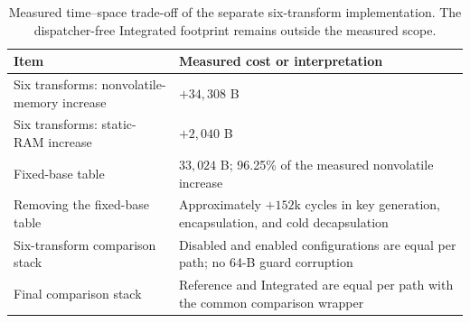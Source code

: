 \begin{table}[t]
\centering
\caption{Measured time--space trade-off of the separate six-transform implementation. The dispatcher-free Integrated footprint remains outside the measured scope.}
\label{tab:resource-tradeoff}
\footnotesize
\renewcommand{\arraystretch}{1.10}
\begin{tabularx}{\textwidth}{@{}l>{\raggedright\arraybackslash}X@{}}
\toprule
Item & Measured cost or interpretation \\
\midrule
Six transforms: nonvolatile-memory increase & $+34{,}308$ B \\
Six transforms: static-RAM increase & $+2{,}040$ B \\
Fixed-base table & $33{,}024$ B; 96.25\% of the measured nonvolatile increase \\
Removing the fixed-base table & Approximately $+152$k cycles in key generation, encapsulation, and cold decapsulation \\
Six-transform comparison stack & Disabled and enabled configurations are equal per path; no 64-B guard corruption \\
Final comparison stack & Reference and Integrated are equal per path with the common comparison wrapper \\
\bottomrule
\end{tabularx}
\end{table}
